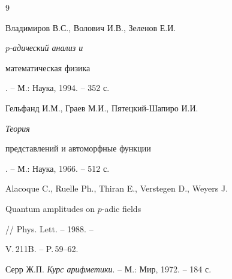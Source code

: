 


\begin{thebibliography}{9} 


 




Владимиров В.С., Волович И.В., Зеленов Е.И. {\em $p$-адический анализ и 


математическая физика}. -- М.: Наука, 1994. -- 352 с. 




Гельфанд И.М., Граев М.И., Пятецкий-Шапиро И.И. {\em Теория 


представлений и автоморфные функции}. -- М.: Наука, 1966. -- 512 с. 




Alacoque C., Ruelle Ph., Thiran E., Verstegen D., Weyers J. {\em 


Quantum amplitudes on $p$-adic fields} // Phys. Lett. -- 1988. -- 


V.\,211B. -- P.\,59--62. 




Серр Ж.П. {\em Курс арифметики}. -- М.: Мир, 1972. -- 184 с. 


 


\end{thebibliography} 


 


\vskip 2cm 


 






 


\label{end} 


 


 


